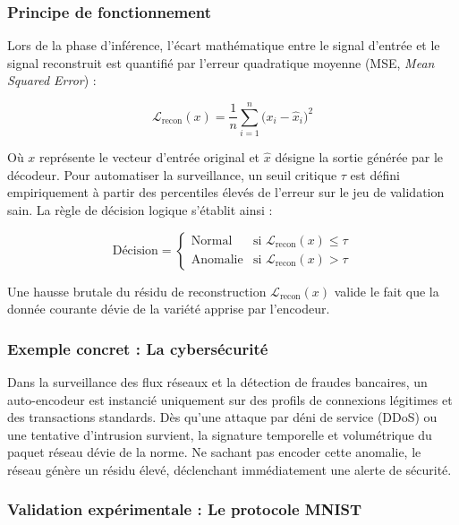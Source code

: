 \documentclass[11pt,a4paper]{report}
\begin{document}
\subsubsection*{Principe de fonctionnement}

Lors de la phase d'inférence, l'écart mathématique entre le signal d'entrée et le signal reconstruit est quantifié par l'erreur quadratique moyenne (MSE, \textit{Mean Squared Error}) :

\begin{equation}
    \mathcal{L}_{\text{recon}}(x) = \frac{1}{n} \sum_{i=1}^{n} \bigl(x_i - \hat{x}_i\bigr)^2
\end{equation}

Où $x$ représente le vecteur d'entrée original et $\hat{x}$ désigne la sortie générée par le décodeur. Pour automatiser la surveillance, un seuil critique $\tau$ est défini empiriquement à partir des percentiles élevés de l'erreur sur le jeu de validation sain. La règle de décision logique s'établit ainsi :

\begin{equation}
    \text{Décision} =
    \begin{cases}
        \text{Normal}   & \text{si } \mathcal{L}_{\text{recon}}(x) \leq \tau \\
        \text{Anomalie} & \text{si } \mathcal{L}_{\text{recon}}(x) >    \tau
    \end{cases}
\end{equation}

Une hausse brutale du résidu de reconstruction $\mathcal{L}_{\text{recon}}(x)$ valide le fait que la donnée courante dévie de la variété apprise par l'encodeur.

\subsubsection*{Exemple concret : La cybersécurité}

Dans la surveillance des flux réseaux et la détection de fraudes bancaires, un auto-encodeur est instancié uniquement sur des profils de connexions légitimes et des transactions standards. Dès qu'une attaque par déni de service (DDoS) ou une tentative d'intrusion survient, la signature temporelle et volumétrique du paquet réseau dévie de la norme. Ne sachant pas encoder cette anomalie, le réseau génère un résidu élevé, déclenchant immédiatement une alerte de sécurité.

\subsubsection*{Validation expérimentale : Le protocole MNIST}
\end{document}
